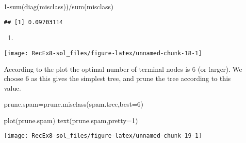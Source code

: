 \documentclass[
]{article}
\newenvironment{Shaded}{\begin{snugshade}}{\end{snugshade}}
\newcommand{\AttributeTok}[1]{\textcolor[rgb]{0.77,0.63,0.00}{#1}}
\newcommand{\DecValTok}[1]{\textcolor[rgb]{0.00,0.00,0.81}{#1}}
\newcommand{\FunctionTok}[1]{\textcolor[rgb]{0.00,0.00,0.00}{#1}}
\newcommand{\NormalTok}[1]{#1}
\newcommand{\OtherTok}[1]{\textcolor[rgb]{0.56,0.35,0.01}{#1}}
\newcommand{\SpecialCharTok}[1]{\textcolor[rgb]{0.00,0.00,0.00}{#1}}
\newcommand{\StringTok}[1]{\textcolor[rgb]{0.31,0.60,0.02}{#1}}
\providecommand{\tightlist}{%
  \setlength{\itemsep}{0pt}\setlength{\parskip}{0pt}}
\begin{document}
\begin{Shaded}
\begin{Highlighting}[]
\DecValTok{1}\SpecialCharTok{{-}}\FunctionTok{sum}\NormalTok{(}\FunctionTok{diag}\NormalTok{(misclass))}\SpecialCharTok{/}\FunctionTok{sum}\NormalTok{(misclass)}
\end{Highlighting}
\end{Shaded}

\begin{verbatim}
## [1] 0.09703114
\end{verbatim}

\begin{enumerate}
\def\labelenumi{\alph{enumi})}
\setcounter{enumi}{4}
\tightlist
\item
\end{enumerate}

\begin{Shaded}
\end{Shaded}

\texttt{[image: RecEx8-sol\_files/figure-latex/unnamed-chunk-18-1]}

According to the plot the optimal number of terminal nodes is 6 (or
larger). We choose 6 as this gives the simplest tree, and prune the tree
according to this value.

\begin{Shaded}
\begin{Highlighting}[]
\NormalTok{prune.spam}\OtherTok{=}\FunctionTok{prune.misclass}\NormalTok{(spam.tree,}\AttributeTok{best=}\DecValTok{6}\NormalTok{)}

\FunctionTok{plot}\NormalTok{(prune.spam)}
\FunctionTok{text}\NormalTok{(prune.spam,}\AttributeTok{pretty=}\DecValTok{1}\NormalTok{)}
\end{Highlighting}
\end{Shaded}

\texttt{[image: RecEx8-sol\_files/figure-latex/unnamed-chunk-19-1]}
\end{document}
